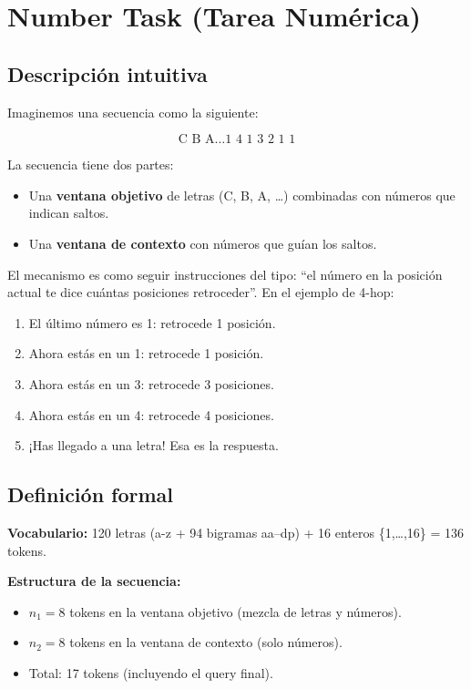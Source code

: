 \documentclass[12pt,a4paper,oneside]{report}
\begin{document}
\section{Number Task (Tarea Numérica)}

\subsection{Descripción intuitiva}

Imaginemos una secuencia como la siguiente:

\[
\text{C B A} \dots \text{1 4 1 3 2 1 1}
\]

La secuencia tiene dos partes:
\begin{itemize}
    \item Una \textbf{ventana objetivo} de letras (C, B, A, \dots) combinadas con números que indican saltos.
    \item Una \textbf{ventana de contexto} con números que guían los saltos.
\end{itemize}

El mecanismo es como seguir instrucciones del tipo: ``el número en la posición actual te dice cuántas posiciones retroceder''. En el ejemplo de 4-hop:

\begin{enumerate}
    \item El último número es 1: retrocede 1 posición.
    \item Ahora estás en un 1: retrocede 1 posición.
    \item Ahora estás en un 3: retrocede 3 posiciones.
    \item Ahora estás en un 4: retrocede 4 posiciones.
    \item ¡Has llegado a una letra! Esa es la respuesta.
\end{enumerate}

\subsection{Definición formal}

\textbf{Vocabulario:} 120 letras (a-z + 94 bigramas aa--dp) + 16 enteros \{1,\dots,16\} = 136 tokens.

\textbf{Estructura de la secuencia:}
\begin{itemize}
    \item $n_1 = 8$ tokens en la ventana objetivo (mezcla de letras y números).
    \item $n_2 = 8$ tokens en la ventana de contexto (solo números).
    \item Total: 17 tokens (incluyendo el query final).
\end{itemize}
\end{document}
